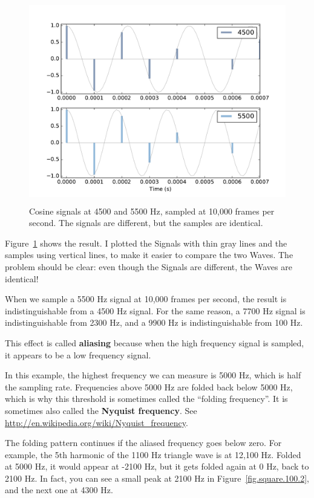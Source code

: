 \documentclass[12pt]{book}
\begin{document}
\begin{figure}
\centerline{\includegraphics[height=3.5in]{figs/aliasing1.pdf}}
\caption{Cosine signals at 4500 and 5500 Hz, sampled at 10,000 frames
per second.  The signals are different, but the samples are identical.}
\label{fig.aliasing1}
\end{figure}

Figure~\ref{fig.aliasing1} shows the result.  I plotted the Signals
with thin gray lines and the samples using vertical lines,
to make it easier to compare the
two Waves.  The problem
should be clear: even though the Signals are different, the
Waves are identical!

When we sample a 5500 Hz signal at 10,000 frames per second, the
result is indistinguishable from a 4500 Hz signal.
For the same reason, a 7700 Hz signal is indistinguishable
from 2300 Hz, and a 9900 Hz is indistinguishable from 100 Hz.

This effect is called {\bf aliasing} because when the high frequency
signal is sampled, it appears to be a low frequency signal.

In this example, the highest frequency we can measure is 5000 Hz,
which is half the sampling rate.  Frequencies above 5000 Hz are folded
back below 5000 Hz, which is why this threshold is sometimes called
the ``folding frequency''.  It is sometimes also called the {\bf
  Nyquist frequency}.  See
\url{http://en.wikipedia.org/wiki/Nyquist_frequency}.

The folding pattern continues if the aliased frequency goes below
zero.  For example, the 5th harmonic of the 1100 Hz triangle wave is
at 12,100 Hz.  Folded at 5000 Hz, it would appear at -2100 Hz, but it
gets folded again at 0 Hz, back to 2100 Hz.  In fact, you can see a
small peak at 2100 Hz in Figure~\ref{fig.square.100.2}, and the next
one at 4300 Hz.
\end{document}
